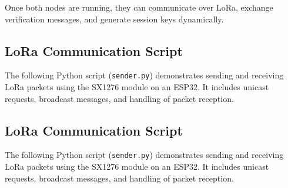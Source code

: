 Once both nodes are running, they can communicate over LoRa, exchange verification messages, and generate session keys dynamically.

\subsection{LoRa Communication Script}

The following Python script (\texttt{sender.py}) demonstrates sending and receiving LoRa packets using the SX1276 module on an ESP32. It includes unicast requests, broadcast messages, and handling of packet reception.

\subsection{LoRa Communication Script}

The following Python script (\texttt{sender.py}) demonstrates sending and receiving LoRa packets using the SX1276 module on an ESP32. It includes unicast requests, broadcast messages, and handling of packet reception.

